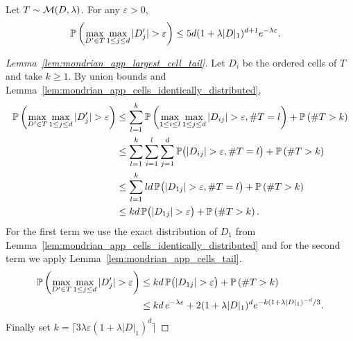 \begin{lemma}
  \label{lem:mondrian_app_largest_cell_tail}

  Let $T \sim \cM(D, \lambda)$.
  For any $\varepsilon > 0$,
  \begin{align*}
    \P\left(
      \max_{D' \in T}
      \max_{1 \leq j \leq d}
      |D'_j| > \varepsilon
    \right)
    &\leq
    5d (1 + \lambda |D|_1)^{d+1}
    e^{-\lambda \varepsilon}.
  \end{align*}
\end{lemma}

\begin{proof}[Lemma~\ref{lem:mondrian_app_largest_cell_tail}]

  Let $D_i$ be the ordered cells of $T$ and take $k \geq 1$.
  By union bounds and
  Lemma~\ref{lem:mondrian_app_cells_identically_distributed},
  \begin{align*}
    \P\left(
      \max_{D' \in T}
      \max_{1 \leq j \leq d}
      |D'_j| > \varepsilon
    \right)
    &\leq
    \sum_{l=1}^k
    \P\left(
      \max_{1 \leq i \leq l}
      \max_{1 \leq j \leq d}
      |D_{i j}| > \varepsilon,
      \# T = l
    \right)
    + \P\left( \# T > k \right) \\
    &\leq
    \sum_{l=1}^k
    \sum_{i=1}^l
    \sum_{j=1}^d
    \P\big(
      |D_{i j}| > \varepsilon,
      \# T = l
    \big)
    + \P\left( \# T > k \right) \\
    &\leq
    \sum_{l=1}^k
    l d \,
    \P\big(
      |D_{1j}| > \varepsilon,
      \# T = l
    \big)
    + \P\left( \# T > k \right) \\
    &\leq
    k d \,
    \P\big(|D_{1 j}| > \varepsilon \big)
    + \P\left( \# T > k \right).
  \end{align*}
  For the first term we use the exact distribution of
  $D_1$ from Lemma~\ref{lem:mondrian_app_cells_identically_distributed}
  and for the second term we apply Lemma~\ref{lem:mondrian_app_cells_tail}.
  \begin{align*}
    \P\left(
      \max_{D' \in T}
      \max_{1 \leq j \leq d}
      |D'_j| > \varepsilon
    \right)
    &\leq
    k d \, \P\big(|D_{1 j}| > \varepsilon \big)
    + \P\left( \# T > k \right) \\
    &\leq
    k d \, e^{-\lambda \varepsilon}
    + 2 (1 + \lambda |D|_1)^d
    e^{-k (1 + \lambda |D|_1)^{-d} / 3}.
  \end{align*}
  Finally set
  $k = \big\lceil 3 \lambda \varepsilon (1 + \lambda |D|_1)^d \big\rceil$

\end{proof}
